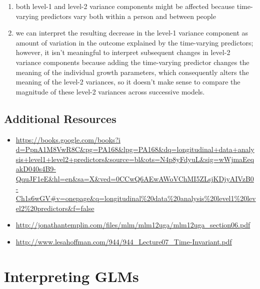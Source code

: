 \documentclass[
  letterpaper,
  DIV=11,
  numbers=noendperiod]{scrreprt}
\begin{document}
\begin{enumerate}
\def\labelenumi{\arabic{enumi}.}
\item
  both level-1 and level-2 variance components might be affected because
  time-varying predictors vary both within a person and between people
\item
  we can interpret the resulting decrease in the level-1 variance
  component as amount of variation in the outcome explained by the
  time-varying predictors; however, it isn't meaningful to interpret
  subsequent changes in level-2 variance components because adding the
  time-varying predictor changes the meaning of the individual growth
  parameters, which consequently alters the meaning of the level-2
  variances, so it doesn't make sense to compare the magnitude of these
  level-2 variances across successive models.
\end{enumerate}

\hypertarget{additional-resources-1}{%
\section{Additional Resources}\label{additional-resources-1}}

\begin{itemize}
\item
  \href{https://books.google.com/books?i\%20d=PpnA1M8VwR8C\&pg=PA168\&lpg=PA168\&dq=longitudinal+data+analysis+level1+level2+predictors\&source=bl\&ots=N4p8yFdyuL\&sig=wWjmaEeqakD040s4B9-QquJF1eE\&hl=en\&sa=X\&ved=0CCwQ6AEwAWoVChMI5ZLsjKDjyAIVzB0-Ch1s6wGV\#v=onepage\&q=longitudinal\%20data\%20analysis\%20level1\%20level2\%20predictors\&f=false}{https://books.google.com/books?i
  d=PpnA1M8VwR8C\&pg=PA168\&lpg=PA168\&dq=longitudinal+data+analysis+level1+level2+predictors\&source=bl\&ots=N4p8yFdyuL\&sig=wWjmaEeqakD040s4B9-QquJF1eE\&hl=en\&sa=X\&ved=0CCwQ6AEwAWoVChMI5ZLsjKDjyAIVzB0-Ch1s6wGV\#v=onepage\&q=longitudinal\%20data\%20analysis\%20level1\%20level2\%20predictors\&f=false}
\item
  \url{http://jonathantemplin.com/files/mlm/mlm12uga/mlm12uga_section06.pdf}
\item
  \url{http://www.lesahoffman.com/944/944_Lecture07_Time-Invariant.pdf}
\end{itemize}

\hypertarget{interpreting-glms}{%
\chapter{Interpreting GLMs}\label{interpreting-glms}}
\end{document}

